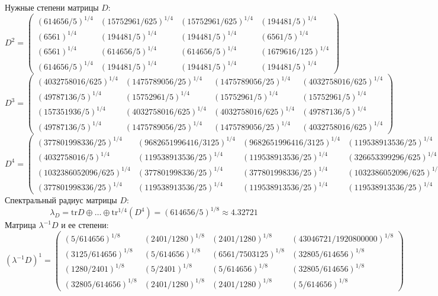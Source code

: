 Нужные степени матрицы $D$:
$$D^2 = \begin{pmatrix}
(614656/5)^{1/4} & (15752961/625)^{1/4} & (15752961/625)^{1/4} & (194481/5)^{1/4}\\
(6561)^{1/4} & (194481/5)^{1/4} & (194481/5)^{1/4} & (6561/5)^{1/4}\\
(6561)^{1/4} & (614656/5)^{1/4} & (614656/5)^{1/4} & (1679616/125)^{1/4}\\
(614656/5)^{1/4} & (194481/5)^{1/4} & (194481/5)^{1/4} & (194481/5)^{1/4}
\end{pmatrix}
$$
$$D^3 = \begin{pmatrix}
(4032758016/625)^{1/4} & (1475789056/25)^{1/4} & (1475789056/25)^{1/4} & (4032758016/625)^{1/4}\\
(49787136/5)^{1/4} & (15752961/5)^{1/4} & (15752961/5)^{1/4} & (15752961/5)^{1/4}\\
(157351936/5)^{1/4} & (4032758016/625)^{1/4} & (4032758016/625)^{1/4} & (49787136/5)^{1/4}\\
(49787136/5)^{1/4} & (1475789056/25)^{1/4} & (1475789056/25)^{1/4} & (4032758016/625)^{1/4}
\end{pmatrix}
$$
$$D^4 = \begin{pmatrix}
(377801998336/25)^{1/4} & (9682651996416/3125)^{1/4} & (9682651996416/3125)^{1/4} & (119538913536/25)^{1/4}\\
(4032758016/5)^{1/4} & (119538913536/25)^{1/4} & (119538913536/25)^{1/4} & (326653399296/625)^{1/4}\\
(1032386052096/625)^{1/4} & (377801998336/25)^{1/4} & (377801998336/25)^{1/4} & (1032386052096/625)^{1/4}\\
(377801998336/25)^{1/4} & (119538913536/25)^{1/4} & (119538913536/25)^{1/4} & (119538913536/25)^{1/4}
\end{pmatrix}
$$
Спектральный радиус матрицы $D$:
$$\lambda_{D} = \mathrm{tr}D\oplus \dots \oplus \mathrm{tr}^{1/4}(D^{4}) = (614656/5)^{1/8} \approx 4.32721$$
Матрица $\lambda^{-1}D$ и ее степени:
$$(\lambda^{-1}D)^1 = \begin{pmatrix}
(5/614656)^{1/8} & (2401/1280)^{1/8} & (2401/1280)^{1/8} & (43046721/1920800000)^{1/8}\\
(3125/614656)^{1/8} & (5/614656)^{1/8} & (6561/7503125)^{1/8} & (32805/614656)^{1/8}\\
(1280/2401)^{1/8} & (5/2401)^{1/8} & (5/614656)^{1/8} & (32805/614656)^{1/8}\\
(32805/614656)^{1/8} & (2401/1280)^{1/8} & (2401/1280)^{1/8} & (5/614656)^{1/8}
\end{pmatrix}
$$
